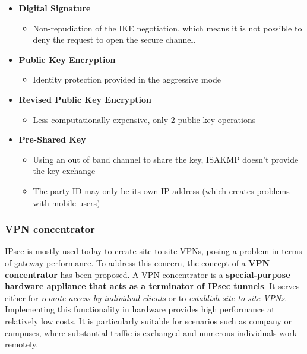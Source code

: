 \begin{itemize}
	\item \textbf{Digital Signature}
	      \begin{itemize}
		      \item Non-repudiation of the IKE negotiation, which means it is not possible to deny the request to open the secure channel.
	      \end{itemize}

	\item \textbf{Public Key Encryption}
	      \begin{itemize}
		      \item Identity protection provided in the aggressive mode
	      \end{itemize}

	\item \textbf{Revised Public Key Encryption}
	      \begin{itemize}
		      \item Less computationally expensive, only 2 public-key operations
	      \end{itemize}

	\item \textbf{Pre-Shared Key}
	      \begin{itemize}
	      	  \item Using an out of band channel to share the key, ISAKMP doesn't provide the key exchange
		      \item The party ID may only be its own IP address (which creates problems with mobile users)
	      \end{itemize}
\end{itemize}



\subsubsection{VPN concentrator}
IPsec is mostly used today to create site-to-site VPNs, posing a problem in terms of gateway performance. To address this concern, the concept of a \textbf{VPN concentrator} has been proposed. A VPN concentrator is a \textbf{special-purpose hardware appliance that acts as a terminator of IPsec tunnels}. It serves either for \textit{remote access by individual clients} or to \textit{establish site-to-site VPNs}. Implementing this functionality in hardware provides high performance at relatively low costs. It is particularly suitable for scenarios such as company or campuses, where substantial traffic is exchanged and numerous individuals work remotely.

